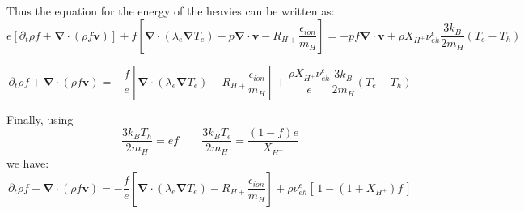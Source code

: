 \documentclass[11pt, oneside]{article}   	%
\begin{document}
Thus the equation for the energy of the heavies can be written as:
\[ e\left[\partial_t \rho f + \boldsymbol{\nabla}\cdot(\rho f \boldsymbol{v})\right] + f \left[ \boldsymbol{\nabla}\cdot(\lambda_e\boldsymbol{\nabla}T_e)  - p\boldsymbol{\nabla}\cdot\boldsymbol{v} -R_{H+} \frac{\epsilon_{ion}}{m_H} \right] =- p f \boldsymbol{\nabla}\cdot \boldsymbol{v} + \rho X_{H^+}\nu_{eh}^\epsilon \frac{3k_B}{2 m_H}(T_e - T_h) \]

\[ \partial_t \rho f + \boldsymbol{\nabla}\cdot(\rho f \boldsymbol{v}) = - \frac{f}{e} \left[ \boldsymbol{\nabla}\cdot(\lambda_e\boldsymbol{\nabla}T_e)  -R_{H+} \frac{\epsilon_{ion}}{m_H} \right] + \frac{\rho X_{H^+}\nu_{eh}^\epsilon}{e}\frac{3k_B}{2m_H}(T_e - T_h) \]

Finally, using
\[ \frac{3k_BT_h}{2 m_H} = ef \qquad \frac{3k_B T_e}{2m_H} = \frac{(1-f)e}{X_{H^+}} \]
 we have:
\[ \partial_t \rho f + \boldsymbol{\nabla}\cdot(\rho f \boldsymbol{v}) = - \frac{f}{e} \left[ \boldsymbol{\nabla}\cdot(\lambda_e\boldsymbol{\nabla}T_e)  -R_{H+} \frac{\epsilon_{ion}}{m_H}  \right] + \rho \nu_{eh}^\epsilon [\, 1- (1 + X_{H^+})f \,] \]
\end{document}
